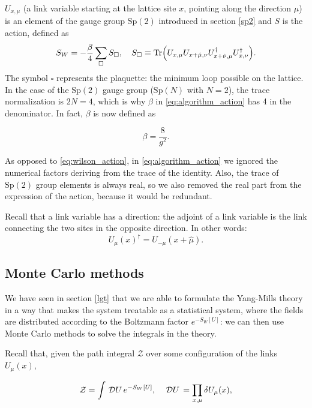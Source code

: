 \documentclass[reqno,12pt]{article}
\numberwithin{equation}{section}
\newcommand{\D}[1]{\,\mathcal{D}#1\,}
\newcommand{\Z}{\mathcal{Z}}
\newcommand{\Sp}{\mathrm{Sp}}
\begin{document}
$U_{x,\mu}$ (a link variable starting at the lattice site $x$, pointing
along the direction $\mu$) is an element of the gauge group $\Sp(2)$ introduced in section \ref{sp2}
and $S$ is the action, defined as
\begin{equation} \label{eq:algorithm_action}
	S_W = - \frac{\beta}{4} \sum_\square S_\square \qc 
	S_\square \equiv \Tr(U_{x,\mu}U_{x+\hat{\mu}, \nu}U^\dagger_{x+\hat{\nu}, \mu}U^\dagger_{x,\nu}).
\end{equation}
The symbol $\square$ represents the plaquette: the minimum loop possible on the lattice. In the case of the $\Sp(2)$
gauge group ($\Sp(N)$ with $N = 2$), the trace normalization is $2N = 4$, which is why $\beta$ in \eqref{eq:algorithm_action} has
4 in the denominator. In fact, $\beta$ is now defined as

\begin{equation} \label{eq:algorithm_beta}
	\beta = \frac{8}{g^2}.
\end{equation}

As opposed to \eqref{eq:wilson_action}, in \eqref{eq:algorithm_action} we ignored the numerical factors deriving from
the trace of the identity. Also, the trace of $\Sp(2)$ group elements is always real, so we also removed the real part
from the expression of the action, because it would be redundant. 

Recall that a link 
variable has a direction: the adjoint of a link variable is the link connecting the two sites in the opposite
direction. In other words:
\begin{equation}
	U_\mu(x)^\dagger = U_{-\mu}(x + \hat\mu).
\end{equation}

\subsection{Monte Carlo methods} \label{montecarlo}

We have seen in section \ref{lgt} that we are able to formulate the Yang-Mills theory in a way
that makes the system treatable as a statistical system, where the fields are distributed according to the Boltzmann
factor $e^{-S_W[U]}$: we can then use Monte Carlo methods to solve the integrals in the theory. 

Recall that, given the path integral $\Z$ over some configuration of the links $U_\mu(x)$,

\begin{equation}
	\Z = \int \D U e^{-S_W[U]} \qc \D U = \prod_{x,\mu} \delta U_\mu(x),
\end{equation}
\end{document}
